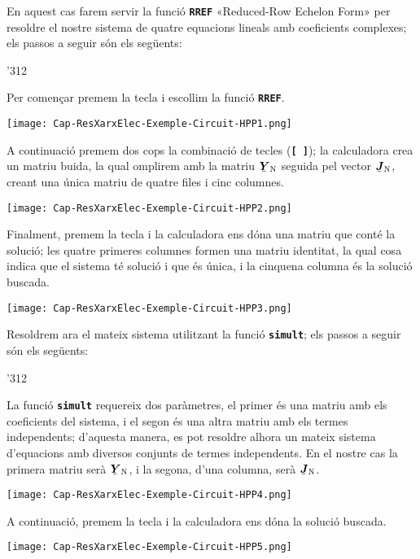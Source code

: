 \begin{exemple}
    En aquest cas farem servir la funció \texttt{\textbf{RREF}} «Reduced-Row Echelon Form» per resoldre el nostre sistema de quatre equacions lineals amb coeficients complexes; els passos a seguir són els següents:

    \begin{dingautolist}{'312}
         \item Per començar premem la tecla \fbox{\hspace{2mm}\faBriefcase\hspace{2mm}} i escollim la funció \texttt{\textbf{RREF}}.

             \texttt{[image: Cap-ResXarxElec-Exemple-Circuit-HPP1.png]}
         \item A continuació premem dos cops la combinació de tecles    (\texttt{\textbf{[ ]}}); la calculadora crea un matriu buida, la qual omplirem amb la matriu $\mcmplx{Y}\ped{N}$ seguida pel vector $\mcmplx{J}\ped{N}$, creant una única matriu de quatre files i cinc columnes.

             \texttt{[image: Cap-ResXarxElec-Exemple-Circuit-HPP2.png]}

         \item Finalment, premem la tecla  i la calculadora ens dóna una matriu que conté la solució; les quatre primeres columnes formen una matriu identitat, la qual cosa indica que el sistema té solució i que és única, i la cinquena columna és la  solució buscada.

         \texttt{[image: Cap-ResXarxElec-Exemple-Circuit-HPP3.png]}
    \end{dingautolist}
    
    Resoldrem ara el mateix sistema utilitzant  la funció \texttt{\textbf{simult}}; els passos a seguir són els següents:

    \begin{dingautolist}{'312}
         \item La funció \texttt{\textbf{simult}} requereix dos paràmetres, el primer és una matriu amb els coeficients del sistema, i el segon és una altra matriu amb els termes independents; d'aquesta manera, es pot resoldre alhora un mateix sistema d'equacions amb diversos conjunts de termes independents. En el nostre cas la primera matriu serà $\mcmplx{Y}\ped{N}$, i la segona, d'una columna, serà  $\mcmplx{J}\ped{N}$.
             
             \texttt{[image: Cap-ResXarxElec-Exemple-Circuit-HPP4.png]}
                     
         \item A continuació, premem la tecla  i la calculadora ens dóna la  solució buscada.

         \texttt{[image: Cap-ResXarxElec-Exemple-Circuit-HPP5.png]}
    \end{dingautolist}    
\end{exemple}


